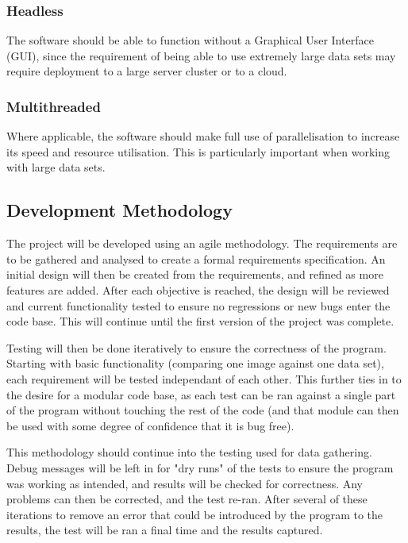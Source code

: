\documentclass[12pt]{article}
\begin{document}
\subsubsection{Headless}
The software should be able to function without a Graphical User Interface (GUI), since the requirement of being able to use extremely large data sets may require deployment to a large server cluster or to a cloud.

\subsubsection{Multithreaded}
Where applicable, the software should make full use of parallelisation to increase its speed and resource utilisation. This is particularly important when working with large data sets.

\subsection{Development Methodology}
The project will be developed using an agile methodology. The requirements are to be gathered and analysed to create a formal requirements specification. An initial design will then be created from the requirements, and refined as more features are added. After each objective is reached, the design will be reviewed and current functionality tested to ensure no regressions or new bugs enter the code base. This will continue until the first version of the project was complete.

Testing will then be done iteratively to ensure the correctness of the program. Starting with basic functionality (comparing one image against one data set), each requirement will be tested independant of each other. This further ties in to the desire for a modular code base, as each test can be ran against a single part of the program without touching the rest of the code (and that module can then be used with some degree of confidence that it is bug free).

This methodology should continue into the testing used for data gathering. Debug messages will be left in for "dry runs" of the tests to ensure the program was working as intended, and results will be checked for correctness. Any problems can then be corrected, and the test re-ran. After several of these iterations to remove an error that could be introduced by the program to the results, the test will be ran a final time and the results captured.
\end{document}

